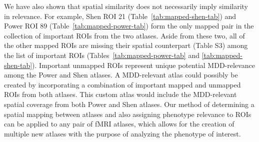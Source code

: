 \documentclass[10pt,letterpaper]{article}\usepackage[]{graphicx}\usepackage[]{color}
\begin{document}
We have also shown that spatial similarity does not necessarily imply similarity in relevance. For example, Shen ROI 21 (Table~\ref{tab:mapped-shen-tab}) and Power ROI 89 (Table~\ref{tab:mapped-power-tab}) form the only mapped pair in the collection of important ROIs from the two atlases. Aside from these two, all of the other mapped ROIs are missing their spatial counterpart (Table S3) among the list of important ROIs (Tables~\ref{tab:mapped-power-tab} and \ref{tab:mapped-shen-tab}). Important unmapped ROIs represent unique potential MDD-relevance among the Power and Shen atlases. A MDD-relevant atlas could possibly be created by incorporating a combination of important mapped and unmapped ROIs from both atlases. This custom atlas would include the MDD-relevant spatial coverage from both Power and Shen atlases. Our method of determining a spatial mapping between atlases and also assigning phenotype relevance to ROIs can be applied to any pair of fMRI atlases, which allows for the creation of multiple new atlases with the purpose of analyzing the phenotype of interest.


\end{document}
